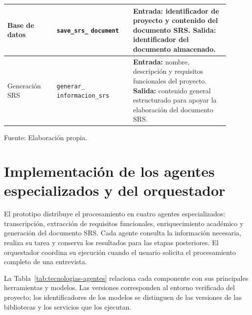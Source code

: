 \begin{table}[H]
\begin{tabular}{
        |>{\raggedright\arraybackslash}p{0.20\linewidth}
        |>{\raggedright\arraybackslash}p{0.31\linewidth}
        |>{\raggedright\arraybackslash}p{0.39\linewidth}|
    }
        Base de datos &
        \texttt{save\_srs\_}\newline
        \texttt{document} &
        \textbf{Entrada:} identificador de proyecto
        y contenido del documento SRS.
        \newline
        \textbf{Salida:} identificador del
        documento almacenado. \\
        \hline

        Generación SRS &
        \texttt{generar\_}\newline
        \texttt{informacion\_srs} &
        \textbf{Entrada:} nombre, descripción
        y requisitos funcionales del proyecto.
        \newline
        \textbf{Salida:} contenido general
        estructurado para apoyar la elaboración
        del documento SRS. \\
        \hline
    \end{tabular}

    \par\smallskip
    \begin{minipage}{0.95\linewidth}
        \footnotesize Fuente: Elaboración propia.
    \end{minipage}
    \endgroup
\end{table}




\section{Implementación de los agentes especializados y del orquestador}

El prototipo distribuye el procesamiento en cuatro agentes
especializados: transcripción, extracción de requisitos
funcionales, enriquecimiento académico y generación del
documento SRS. Cada agente consulta la información necesaria,
realiza su tarea y conserva los resultados para las etapas
posteriores. El orquestador coordina su ejecución cuando
el usuario solicita el procesamiento completo de una
entrevista.

La Tabla~\ref{tab:tecnologias-agentes} relaciona cada
componente con sus principales herramientas y modelos.
Las versiones corresponden al entorno verificado
del proyecto; los identificadores de los modelos
se distinguen de las versiones de las bibliotecas
y los servicios que los ejecutan.

